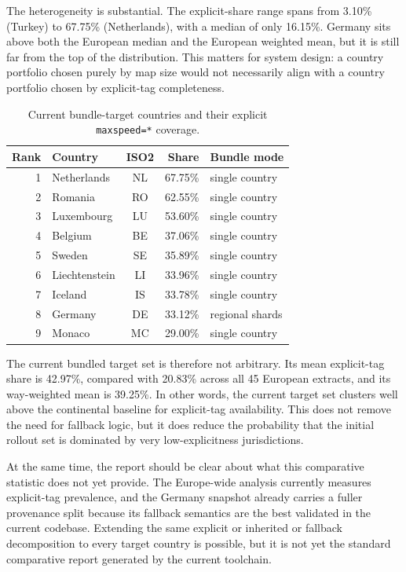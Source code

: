 \documentclass{article}
\begin{document}
The heterogeneity is substantial. The explicit-share range spans from 3.10\% (Turkey) to 67.75\% (Netherlands), with a median of only 16.15\%. Germany sits above both the European median and the European weighted mean, but it is still far from the top of the distribution. This matters for system design: a country portfolio chosen purely by map size would not necessarily align with a country portfolio chosen by explicit-tag completeness.

\begin{table}[!htbp]
\centering
\scriptsize
\caption{Current bundle-target countries and their explicit \texttt{maxspeed=*} coverage.}
\label{tab:target_country_shares}
\begin{tabular}{r p{3.4cm} c r p{2.2cm}}
\toprule
Rank & Country & ISO2 & Share & Bundle mode \\
\midrule
1 & Netherlands & NL & 67.75\% & single country \\
2 & Romania & RO & 62.55\% & single country \\
3 & Luxembourg & LU & 53.60\% & single country \\
4 & Belgium & BE & 37.06\% & single country \\
5 & Sweden & SE & 35.89\% & single country \\
6 & Liechtenstein & LI & 33.96\% & single country \\
7 & Iceland & IS & 33.78\% & single country \\
8 & Germany & DE & 33.12\% & regional shards \\
9 & Monaco & MC & 29.00\% & single country \\
\bottomrule
\end{tabular}
\end{table}

The current bundled target set is therefore not arbitrary. Its mean explicit-tag share is 42.97\%, compared with 20.83\% across all 45 European extracts, and its way-weighted mean is 39.25\%. In other words, the current target set clusters well above the continental baseline for explicit-tag availability. This does not remove the need for fallback logic, but it does reduce the probability that the initial rollout set is dominated by very low-explicitness jurisdictions.

At the same time, the report should be clear about what this comparative statistic does not yet provide. The Europe-wide analysis currently measures explicit-tag prevalence, and the Germany snapshot already carries a fuller provenance split because its fallback semantics are the best validated in the current codebase. Extending the same explicit or inherited or fallback decomposition to every target country is possible, but it is not yet the standard comparative report generated by the current toolchain.
\end{document}
